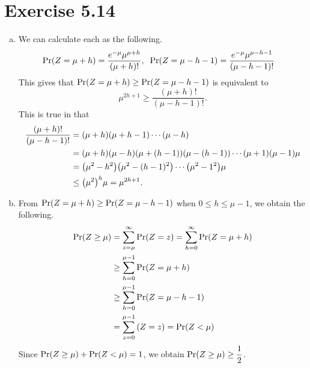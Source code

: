 \documentclass{article}
\begin{document}
\section*{Exercise 5.14}
\begin{enumerate}[(a)]
    \item We can calculate each as the following.
    \begin{align*}
        \mathrm{Pr}\qty(Z=\mu+h) &= \frac{e^{-\mu}\mu^{\mu+h}}{\qty(\mu+h)!}, \;\; \mathrm{Pr}\qty(Z=\mu-h-1) = \frac{e^{-\mu}\mu^{\mu-h-1}}{\qty(\mu-h-1)!}
    \end{align*}
    This gives that $\mathrm{Pr}\qty(Z=\mu+h) \geq \mathrm{Pr}\qty(Z=\mu-h-1)$ is equivalent to 
    $$\mu^{2h+1} \geq \frac{(\mu+h)!}{(\mu-h-1)!}.$$
    This is true in that 
    \begin{align*}
        \frac{(\mu+h)!}{(\mu-h-1)!} &= (\mu+h)(\mu+h-1)\cdots(\mu-h) \\
        &= (\mu+h)(\mu-h)(\mu+(h-1))(\mu-(h-1))\cdots(\mu+1)(\mu-1)\mu \\
        &= \qty(\mu^2-h^2)\qty(\mu^2-(h-1)^2)\cdots\qty(\mu^2-1^2)\mu \\
        &\leq \qty(\mu^2)^h\mu = \mu^{2h+1}.
    \end{align*}
    \item From $\mathrm{Pr}\qty(Z=\mu+h) \geq \mathrm{Pr}\qty(Z=\mu-h-1)$ when $0 \leq h \leq \mu-1$, we obtain the following.
    \begin{align*}
        \mathrm{Pr}\qty(Z\geq\mu) &= \sum_{z=\mu}^{\infty}\mathrm{Pr}\qty(Z=z) = \sum_{h=0}^{\infty}\mathrm{Pr}\qty(Z=\mu+h) \\
        &\geq \sum_{h=0}^{\mu-1}\mathrm{Pr}\qty(Z=\mu+h) \\
        &\geq \sum_{h=0}^{\mu-1}\mathrm{Pr}\qty(Z=\mu-h-1) \\
        &= \sum_{z=0}^{\mu-1}\qty(Z=z) = \mathrm{Pr}\qty(Z<\mu)
    \end{align*}
    Since $\mathrm{Pr}\qty(Z\geq\mu) + \mathrm{Pr}\qty(Z<\mu) = 1$, we obtain $\mathrm{Pr}\qty(Z\geq\mu) \geq \dfrac{1}{2}$.
\end{enumerate}
\end{document}
